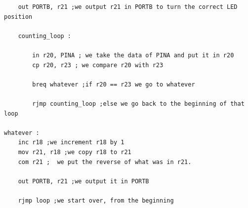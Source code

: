 \documentclass[a4paper,12pt]{article}
\begin{document}
\begin{lstlisting}
	out PORTB, r21 ;we output r21 in PORTB to turn the correct LED position

	counting_loop :

		in r20, PINA ; we take the data of PINA and put it in r20
		cp r20, r23 ; we compare r20 with r23

		breq whatever ;if r20 == r23 we go to whatever

		rjmp counting_loop ;else we go back to the beginning of that loop

whatever :
	inc r18 ;we increment r18 by 1
	mov r21, r18 ;we copy r18 to r21
	com r21 ;  we put the reverse of what was in r21.

	out PORTB, r21 ;we output it in PORTB

	rjmp loop ;we start over, from the beginning
\end{lstlisting}
\end{document}
